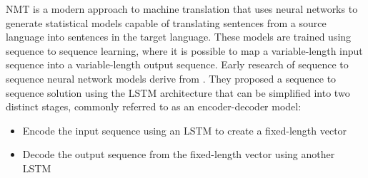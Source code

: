 \acrfull{NMT} is a modern approach to machine translation that uses neural networks to generate statistical models capable of translating sentences from a source language into sentences in the target language.
These models are trained using sequence to sequence learning, where it is possible to map a variable-length input sequence into a variable-length output sequence. %
Early research of sequence to sequence neural network models derive from \cite{sutskever_sequence_2014}. They proposed a sequence to sequence solution using the \acrshort{LSTM} architecture that can be simplified into two distinct stages, commonly referred to as an encoder-decoder model:
\begin{itemize}
    \item Encode the input sequence using an \acrshort{LSTM} to create a fixed-length vector
    \item Decode the output sequence from the fixed-length vector using another \acrshort{LSTM}
\end{itemize}

